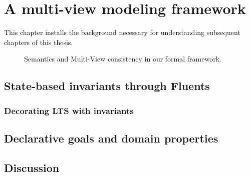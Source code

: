 \chapter{A multi-view modeling framework\label{chapter:framework}}

This chapter installs the background necessary for understanding subsequent chapters of this thesis. 

\vspace{0.4cm}
\begin{figure}[H]\centering
{}
\caption{Semantics and Multi-View consistency in our formal framework.\label{image:framework}}
\end{figure}






\section{State-based invariants through Fluents}

\subsection{Decorating LTS with invariants}

\section{Declarative goals and domain properties}

\section{Discussion\label{section:background-discussion}}

